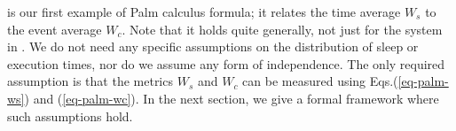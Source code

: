 %
%
%
%
%
%

 is our first example of Palm calculus formula; it
relates the time average $W_s$ to the event average $W_c$. Note that
it holds quite generally, not just for the system in .
We do not need any specific assumptions on the distribution of sleep
or execution times, nor do we assume any form of independence. The
only required assumption is that the metrics $W_s$ and $W_c$ can be
measured using Eqs.(\ref{eq-palm-ws}) and (\ref{eq-palm-wc}). In the
next section, we give a formal framework where such assumptions
hold.

